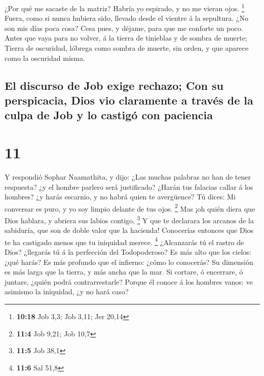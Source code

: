  ¿Por qué me sacaste de la matriz? Habría yo espirado, y no
me vieran ojos. \footnote{\textbf{10:18} Job 3,3; Job 3,11; Jer 20,14}
 Fuera, como si nunca hubiera sido, llevado desde el
vientre á la sepultura.  ¿No son mis días poca cosa? Cesa
pues, y déjame, para que me conforte un poco.  Antes que
vaya para no volver, á la tierra de tinieblas y de sombra de muerte;
 Tierra de oscuridad, lóbrega como sombra de muerte, sin
orden, y que aparece como la oscuridad misma.

\hypertarget{el-discurso-de-job-exige-rechazo-con-su-perspicacia-dios-vio-claramente-a-travuxe9s-de-la-culpa-de-job-y-lo-castiguxf3-con-paciencia}{%
\subsection{El discurso de Job exige rechazo; Con su perspicacia, Dios
vio claramente a través de la culpa de Job y lo castigó con
paciencia}\label{el-discurso-de-job-exige-rechazo-con-su-perspicacia-dios-vio-claramente-a-travuxe9s-de-la-culpa-de-job-y-lo-castiguxf3-con-paciencia}}

\hypertarget{section-10}{%
\section{11}\label{section-10}}

 Y respondió Sophar Naamathita, y dijo:  ¿Las
muchas palabras no han de tener respuesta? ¿y el hombre parlero será
justificado?  ¿Harán tus falacias callar á los hombres? ¿y
harás escarnio, y no habrá quien te avergüence?  Tú dices:
Mi conversar es puro, y yo soy limpio delante de tus ojos. \footnote{\textbf{11:4}
  Job 9,21; Job 10,7}  Mas ¡oh quién diera que Dios hablara,
y abriera sus labios contigo, \footnote{\textbf{11:5} Job 38,1}
 Y que te declarara los arcanos de la sabiduría, que son de
doble valor que la hacienda! Conocerías entonces que Dios te ha
castigado menos que tu iniquidad merece. \footnote{\textbf{11:6} Sal
  51,8}  ¿Alcanzarás tú el rastro de Dios? ¿llegarás tú á la
perfección del Todopoderoso?  Es más alto que los cielos:
¿qué harás? Es más profundo que el infierno: ¿cómo lo conocerás?
 Su dimensión es más larga que la tierra, y más ancha que la
mar.  Si cortare, ó encerrare, ó juntare, ¿quién podrá
contrarrestarle?  Porque él conoce á los hombres vanos: ve
asimismo la iniquidad, ¿y no hará caso?

